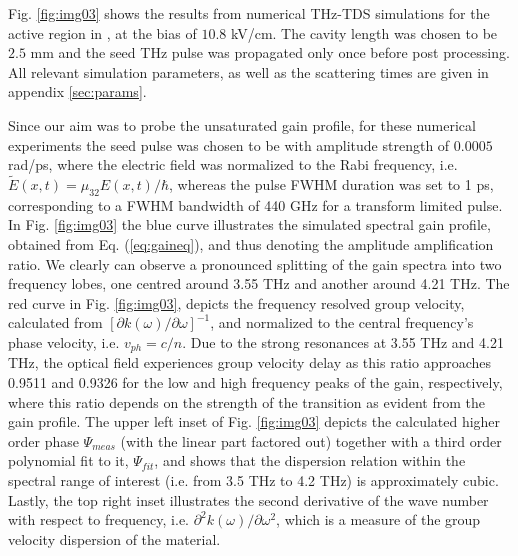 \documentclass[10pt,letterpaper]{article}
\def\p{\partial}
\begin{document}
{Fig. \ref{fig:img03} shows the results from numerical THz-TDS simulations for the active region in \cite{burghoff2014terahertz}, at the bias of $10.8$ kV/cm. The cavity length was chosen to be $2.5$ mm and the seed THz pulse was propagated only once before post processing. All relevant simulation parameters, as well as the scattering times are given in appendix \ref{sec:params}. 

Since our aim was to probe the unsaturated gain profile, for these numerical experiments the seed pulse was chosen to be with amplitude strength of $0.0005$ rad/ps, where the electric field was normalized to the Rabi frequency, i.e. $\tilde{E}(x,t) = \mu_{32} E(x,t)/\hbar$, whereas the pulse FWHM duration was set to 1 ps, corresponding to a FWHM bandwidth of 440 GHz for a transform limited pulse. 
In Fig. \ref{fig:img03} the blue curve illustrates the simulated spectral gain profile, obtained from Eq. (\ref{eq:gaineq}), and thus denoting the  amplitude amplification ratio. We clearly can observe a pronounced splitting of the gain spectra into two frequency lobes, one centred around 3.55 THz and another around 4.21 THz. The red curve in Fig. \ref{fig:img03}, depicts the frequency resolved group velocity, calculated from $[\p k(\omega)/\p \omega]^{-1}$, and normalized to the central frequency's phase velocity, i.e. $v_{ph} = c/n$. Due to the strong resonances at 3.55 THz and 4.21 THz, the optical field experiences group velocity delay as this ratio approaches 0.9511 and 0.9326 for the low and high frequency peaks of the gain, respectively, where this ratio depends on the strength of the transition as evident from the gain profile. The upper left inset of Fig. \ref{fig:img03} depicts the calculated higher order phase $\Psi_{meas}$ (with the linear part factored out) together with a third order polynomial fit to it, $\Psi_{fit}$, and shows that the dispersion relation within the spectral range of interest (i.e. from 3.5 THz to 4.2 THz) is approximately cubic. Lastly, the top right inset illustrates the second derivative of the wave number with respect to frequency, i.e. $\p^2 k(\omega)/\p \omega^2$, which is a measure of the group velocity dispersion of the material.

}
\end{document}
